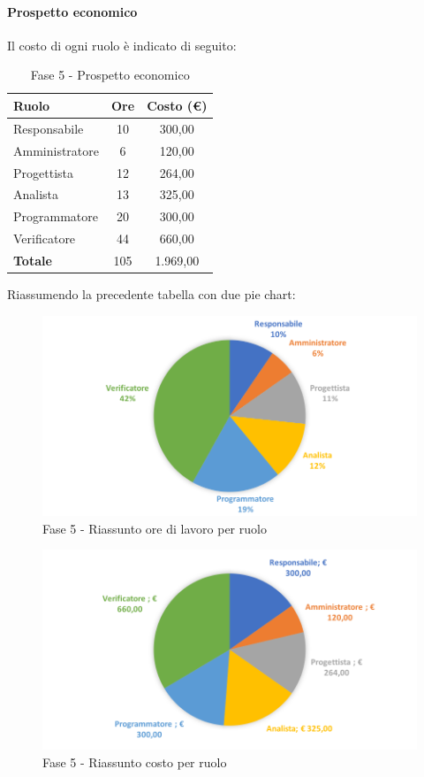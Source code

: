 \documentclass[../PianoDiProgetto.tex]{subfiles}
\begin{document}
			\newpage
			\paragraph{Prospetto economico}
			Il costo di ogni ruolo è indicato di seguito:
			\begin{table}[h]
				\centering
				\begin{tabular}{l * {2}{c}}
				\toprule
				\textbf{Ruolo} & \textbf{Ore} & \textbf{Costo (\euro{})} \\
				\midrule
				Responsabile & 10 & 300,00 \\
				Amministratore & 6 & 120,00 \\
				Progettista & 12 & 264,00 \\
				Analista & 13 & 325,00 \\		
				Programmatore & 20 & 300,00 \\		
				Verificatore & 44 & 660,00 \\				
				\midrule		
				\textbf{Totale} & 105 & 1.969,00 \\
				\bottomrule	
				\end{tabular}
				\caption{Fase 5 - Prospetto economico}		
			\end{table}
			
			Riassumendo la precedente tabella con due pie chart:	
			\begin{figure}[!h]
				\centering
				\includegraphics[width=\textwidth]{Preventivo/Immagini/fase5_oreRuolo.png}
				\caption{Fase 5 - Riassunto ore di lavoro per ruolo}
			\end{figure}
			\newpage	
			\begin{figure}[!h]
				\centering
				\includegraphics[width=\textwidth]{Preventivo/Immagini/fase5_costoRuolo.png}
				\caption{Fase 5 - Riassunto costo per ruolo}
			\end{figure}	
			
\end{document}

